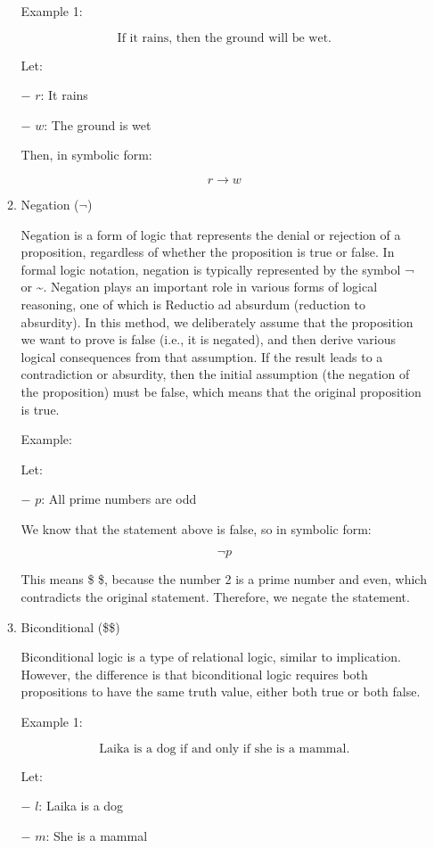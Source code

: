 \begin{enumerate}
\begin{enumerate}
    Example 1:

    \[\text {If it rains, then the ground will be wet.}\]

    Let:

    − \(r\): It rains

    − \(w\): The ground is wet

    Then, in symbolic form:

    \[
     r \rightarrow w
     \]
  \item
    Negation (\(\neg\))

    Negation is a form of logic that represents the denial or rejection
    of a proposition, regardless of whether the proposition is true or
    false. In formal logic notation, negation is typically represented
    by the symbol ¬ or \textasciitilde. Negation plays an important role
    in various forms of logical reasoning, one of which is Reductio ad
    absurdum (reduction to absurdity). In this method, we deliberately
    assume that the proposition we want to prove is false (i.e., it is
    negated), and then derive various logical consequences from that
    assumption. If the result leads to a contradiction or absurdity,
    then the initial assumption (the negation of the proposition) must
    be false, which means that the original proposition is true.

    Example:

    Let:

    − \(p\): All prime numbers are odd

    We know that the statement above is false, so in symbolic form:

    \[
     \neg p
     \]

    This means \$ \$, because the number 2 is a prime number
    and even, which contradicts the original statement. Therefore, we
    negate the statement.
  \item
    Biconditional (\$\leftrightarrow \$)

    Biconditional logic is a type of relational logic, similar to
    implication. However, the difference is that biconditional logic
    requires both propositions to have the same truth value, either both
    true or both false.

    Example 1:

    \[\text {Laika is a dog if and only if she is a mammal.}\]

    Let:

    − \(l\): Laika is a dog

    − \(m\): She is a mammal


\end{enumerate}
\end{enumerate}
